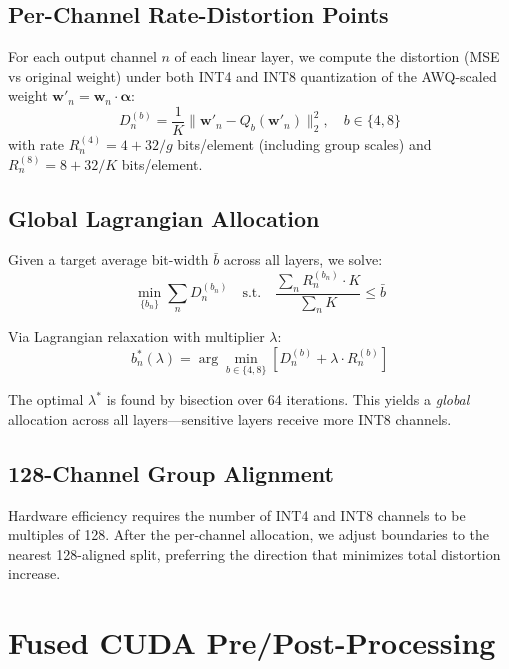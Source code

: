 \documentclass[11pt,a4paper]{article}
\begin{document}
\subsection{Per-Channel Rate-Distortion Points}

For each output channel $n$ of each linear layer, we compute the distortion (MSE vs original weight) under both INT4 and INT8 quantization of the AWQ-scaled weight $\mathbf{w}'_n = \mathbf{w}_n \cdot \boldsymbol{\alpha}$:
\begin{equation}
    D_n^{(b)} = \frac{1}{K} \| \mathbf{w}'_n - Q_b(\mathbf{w}'_n) \|_2^2, \quad b \in \{4, 8\}
\end{equation}
with rate $R_n^{(4)} = 4 + 32/g$ bits/element (including group scales) and $R_n^{(8)} = 8 + 32/K$ bits/element.

\subsection{Global Lagrangian Allocation}

Given a target average bit-width $\bar{b}$ across all layers, we solve:
\begin{equation}
    \min_{\{b_n\}} \sum_n D_n^{(b_n)} \quad \text{s.t.} \quad \frac{\sum_n R_n^{(b_n)} \cdot K}{\sum_n K} \leq \bar{b}
\end{equation}

Via Lagrangian relaxation with multiplier $\lambda$:
\begin{equation}
    b_n^*(\lambda) = \arg\min_{b \in \{4,8\}} \left[ D_n^{(b)} + \lambda \cdot R_n^{(b)} \right]
\end{equation}

The optimal $\lambda^*$ is found by bisection over 64 iterations. This yields a \emph{global} allocation across all layers---sensitive layers receive more INT8 channels.

\subsection{128-Channel Group Alignment}

Hardware efficiency requires the number of INT4 and INT8 channels to be multiples of 128. After the per-channel allocation, we adjust boundaries to the nearest 128-aligned split, preferring the direction that minimizes total distortion increase.


\section{Fused CUDA Pre/Post-Processing}
\label{sec:fused}
\end{document}
